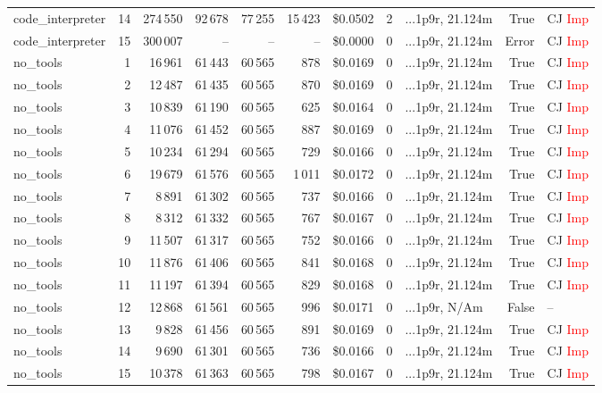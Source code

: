\documentclass[a4paper,11pt]{article}
\begin{document}
\begin{table}[H]
{\begin{tabular}{l r r r r r r r l r l}
code\_interpreter & 14 & 274\,550 & 92\,678 & 77\,255 & 15\,423 & \$0.0502 & 2 & ...1p9r, 21.124m & True & CJ \textcolor{red}{Imp} \\
code\_interpreter & 15 & 300\,007 & -- & -- & -- & \$0.0000 & 0 & ...1p9r, 21.124m & Error & CJ \textcolor{red}{Imp} \\
\midrule
no\_tools & 1 & 16\,961 & 61\,443 & 60\,565 & 878 & \$0.0169 & 0 & ...1p9r, 21.124m & True & CJ \textcolor{red}{Imp} \\
no\_tools & 2 & 12\,487 & 61\,435 & 60\,565 & 870 & \$0.0169 & 0 & ...1p9r, 21.124m & True & CJ \textcolor{red}{Imp} \\
no\_tools & 3 & 10\,839 & 61\,190 & 60\,565 & 625 & \$0.0164 & 0 & ...1p9r, 21.124m & True & CJ \textcolor{red}{Imp} \\
no\_tools & 4 & 11\,076 & 61\,452 & 60\,565 & 887 & \$0.0169 & 0 & ...1p9r, 21.124m & True & CJ \textcolor{red}{Imp} \\
no\_tools & 5 & 10\,234 & 61\,294 & 60\,565 & 729 & \$0.0166 & 0 & ...1p9r, 21.124m & True & CJ \textcolor{red}{Imp} \\
no\_tools & 6 & 19\,679 & 61\,576 & 60\,565 & 1\,011 & \$0.0172 & 0 & ...1p9r, 21.124m & True & CJ \textcolor{red}{Imp} \\
no\_tools & 7 & 8\,891 & 61\,302 & 60\,565 & 737 & \$0.0166 & 0 & ...1p9r, 21.124m & True & CJ \textcolor{red}{Imp} \\
no\_tools & 8 & 8\,312 & 61\,332 & 60\,565 & 767 & \$0.0167 & 0 & ...1p9r, 21.124m & True & CJ \textcolor{red}{Imp} \\
no\_tools & 9 & 11\,507 & 61\,317 & 60\,565 & 752 & \$0.0166 & 0 & ...1p9r, 21.124m & True & CJ \textcolor{red}{Imp} \\
no\_tools & 10 & 11\,876 & 61\,406 & 60\,565 & 841 & \$0.0168 & 0 & ...1p9r, 21.124m & True & CJ \textcolor{red}{Imp} \\
no\_tools & 11 & 11\,197 & 61\,394 & 60\,565 & 829 & \$0.0168 & 0 & ...1p9r, 21.124m & True & CJ \textcolor{red}{Imp} \\
no\_tools & 12 & 12\,868 & 61\,561 & 60\,565 & 996 & \$0.0171 & 0 & ...1p9r, N/Am & False & -- \\
no\_tools & 13 & 9\,828 & 61\,456 & 60\,565 & 891 & \$0.0169 & 0 & ...1p9r, 21.124m & True & CJ \textcolor{red}{Imp} \\
no\_tools & 14 & 9\,690 & 61\,301 & 60\,565 & 736 & \$0.0166 & 0 & ...1p9r, 21.124m & True & CJ \textcolor{red}{Imp} \\
no\_tools & 15 & 10\,378 & 61\,363 & 60\,565 & 798 & \$0.0167 & 0 & ...1p9r, 21.124m & True & CJ \textcolor{red}{Imp} \\

\end{tabular}}
\end{table}
\end{document}
